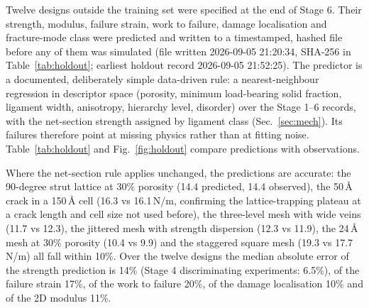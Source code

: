Twelve designs outside the training set were specified at the end of Stage 6. Their strength, modulus, failure strain, work to failure, damage localisation and fracture-mode class were predicted and written to a timestamped, hashed file before any of them was simulated (file written 2026-09-05 21:20:34, SHA-256 in Table~\ref{tab:holdout}; earliest holdout record 2026-09-05 21:52:25). The predictor is a documented, deliberately simple data-driven rule: a nearest-neighbour regression in descriptor space (porosity, minimum load-bearing solid fraction, ligament width, anisotropy, hierarchy level, disorder) over the Stage 1--6 records, with the net-section strength assigned by ligament class (Sec.~\ref{sec:mech}). Its failures therefore point at missing physics rather than at fitting noise. Table~\ref{tab:holdout} and Fig.~\ref{fig:holdout} compare predictions with observations.

Where the net-section rule applies unchanged, the predictions are accurate: the 90-degree strut lattice at 30\% porosity (14.4 predicted, 14.4 observed), the 50\,\AA{} crack in a 150\,\AA{} cell (16.3 vs 16.1\,N/m, confirming the lattice-trapping plateau at a crack length and cell size not used before), the three-level mesh with wide veins (11.7 vs 12.3), the jittered mesh with strength dispersion (12.3 vs 11.9), the 24\,\AA{} mesh at 30\% porosity (10.4 vs 9.9) and the staggered square mesh (19.3 vs 17.7\,N/m) all fall within 10\%. Over the twelve designs the median absolute error of the strength prediction is 14\% (Stage 4 discriminating experiments: 6.5\%), of the failure strain 17\%, of the work to failure 20\%, of the damage localisation 10\% and of the 2D modulus 11\%.


